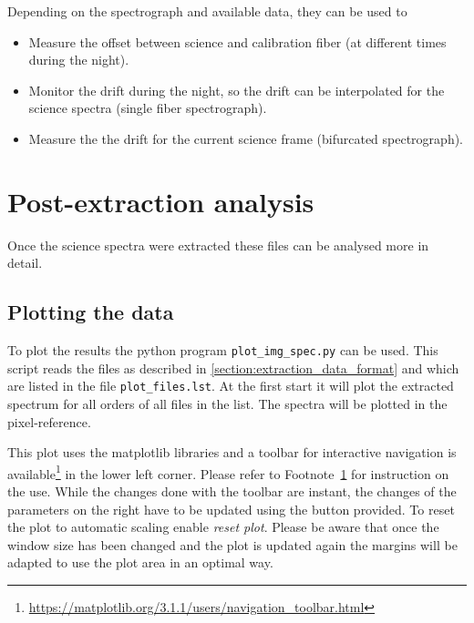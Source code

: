\documentclass[10pt,a4paper]{article}
\begin{document}
Depending on the spectrograph and available data, they can be used to
\begin{itemize}
  \item Measure the offset between science and calibration fiber (at different times during the night).
  \item Monitor the drift during the night, so the drift can be interpolated for the science spectra (single fiber spectrograph).
  \item Measure the the drift for the current science frame (bifurcated spectrograph).
\end{itemize}


\newpage
\section{Post-extraction analysis}

\noindent Once the science spectra were extracted these files can be analysed more in detail. 

\subsection{Plotting the data}
\label{Section:Plotting_extracted_files}
To plot the results the python program \verb|plot_img_spec.py| can be used. This script reads the files as described in \ref{section:extraction_data_format} and which are listed in the file \verb|plot_files.lst|. At the first start it will plot the extracted spectrum for all orders of all files in the list. The spectra will be plotted in the pixel-reference.

This plot uses the matplotlib libraries and a toolbar for interactive navigation is available\footnote{\label{Footnote:matplotlib_toolbar} \url{https://matplotlib.org/3.1.1/users/navigation_toolbar.html}} in the lower left corner. Please refer to Footnote~\ref{Footnote:matplotlib_toolbar} for instruction on the use. While the changes done with the toolbar are instant, the changes of the parameters on the right have to be updated using the button provided. To reset the plot to automatic scaling enable \textit{reset plot}. Please be aware that once the window size has been changed and the plot is updated again the margins will be adapted to use the plot area in an optimal way.
\end{document}
